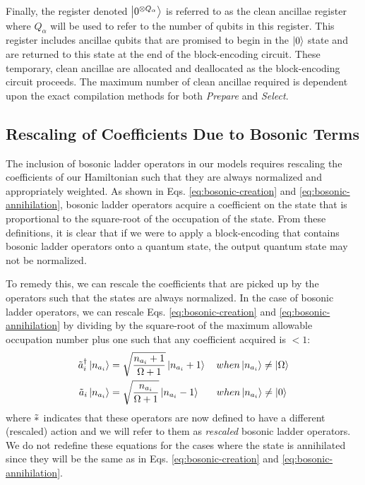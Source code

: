 Finally, the register denoted $\ket{0^{\otimes Q_\alpha}}$ is referred to as the clean ancillae register where $Q_\alpha$ will be used to refer to the number of qubits in this register.
This register includes ancillae qubits that are promised to begin in the $\ket{0}$ state and are returned to this state at the end of the block-encoding circuit.
These temporary, clean ancillae are allocated and deallocated as the block-encoding circuit proceeds.
The maximum number of clean ancillae required is dependent upon the exact compilation methods for both \textit{Prepare} and \textit{Select}.

\subsection{Rescaling of Coefficients Due to Bosonic Terms}
\label{subsec:rescaling}

The inclusion of bosonic ladder operators in our models requires rescaling the coefficients of our Hamiltonian such that they are always normalized and appropriately weighted.
As shown in Eqs. \ref{eq:bosonic-creation} and \ref{eq:bosonic-annihilation}, bosonic ladder operators acquire a coefficient on the state that is proportional to the square-root of the occupation of the state.
From these definitions, it is clear that if we were to apply a block-encoding that contains bosonic ladder operators onto a quantum state, the output quantum state may not be normalized.

To remedy this, we can rescale the coefficients that are picked up by the operators such that the states are always normalized.
In the case of bosonic ladder operators, we can rescale Eqs. \ref{eq:bosonic-creation} and \ref{eq:bosonic-annihilation} by dividing by the square-root of the maximum allowable occupation number plus one such that any coefficient acquired is $< 1$:
\begin{equation}
    \label{eq:bosonic-ops-altered}
    \begin{split}
        \Tilde{a}_i^\dagger \ket{n_{a_i}} &= \sqrt{\frac{n_{a_i} + 1}{\Omega + 1}} \ket{n_{a_i} + 1} \hspace{1em} when \ket{n_{a_i}} \neq \ket{\Omega} \\
        \Tilde{a}_i  \ket{n_{a_i}} &= \sqrt{\frac{n_{a_i}}{\Omega + 1}} \ket{n_{a_i} - 1} \hspace{1.7em} when \ket{n_{a_i}} \neq \ket{0}
    \end{split}
\end{equation}
where $\Tilde{*}$ indicates that these operators are now defined to have a different (rescaled) action and we will refer to them as \textit{rescaled} bosonic ladder operators.
We do not redefine these equations for the cases where the state is annihilated since they will be the same as in Eqs.  \ref{eq:bosonic-creation} and \ref{eq:bosonic-annihilation}.


